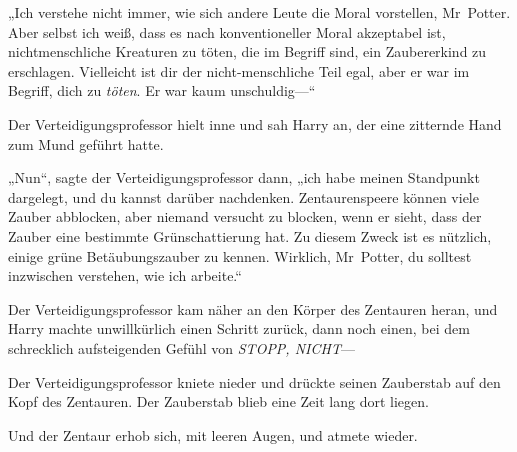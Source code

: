 „Ich verstehe nicht immer, wie sich andere Leute die Moral vorstellen, Mr~Potter. Aber selbst ich weiß, dass es nach konventioneller Moral akzeptabel ist, nichtmenschliche Kreaturen zu töten, die im Begriff sind, ein Zaubererkind zu erschlagen. Vielleicht ist dir der nicht-menschliche Teil egal, aber er war im Begriff, dich zu \emph{töten}. Er war kaum unschuldig—“

Der Verteidigungsprofessor hielt inne und sah Harry an, der eine zitternde Hand zum Mund geführt hatte.

„Nun“, sagte der Verteidigungsprofessor dann, „ich habe meinen Standpunkt dargelegt, und du kannst darüber nachdenken. Zentaurenspeere können viele Zauber abblocken, aber niemand versucht zu blocken, wenn er sieht, dass der Zauber eine bestimmte Grünschattierung hat. Zu diesem Zweck ist es nützlich, einige grüne Betäubungszauber zu kennen. Wirklich, Mr~Potter, du solltest inzwischen verstehen, wie ich arbeite.“

Der Verteidigungsprofessor kam näher an den Körper des Zentauren heran, und Harry machte unwillkürlich einen Schritt zurück, dann noch einen, bei dem schrecklich aufsteigenden Gefühl von \emph{STOPP, NICHT}—

Der Verteidigungsprofessor kniete nieder und drückte seinen Zauberstab auf den Kopf des Zentauren.
%
Der Zauberstab blieb eine Zeit lang dort liegen.

Und der Zentaur erhob sich, mit leeren Augen, und atmete wieder.

